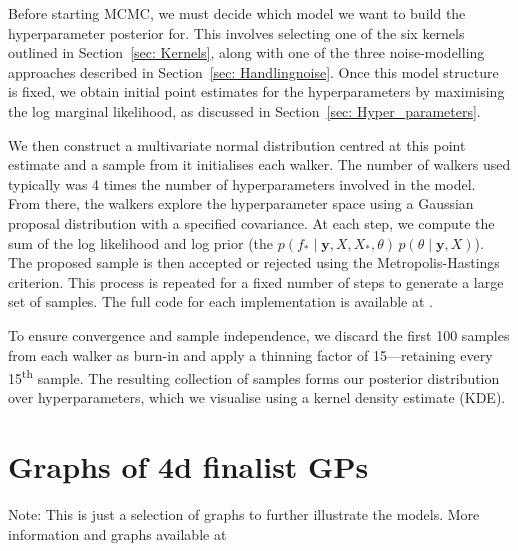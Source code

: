 \documentclass{ucdgradtaughtthesis}
\begin{document}
Before starting MCMC, we must decide which model we want to build the hyperparameter posterior for. This involves selecting one of the six kernels outlined in Section~\ref{sec: Kernels}, along with one of the three noise-modelling approaches described in Section~\ref{sec: Handlingnoise}. Once this model structure is fixed, we obtain initial point estimates for the hyperparameters by maximising the log marginal likelihood, as discussed in Section~\ref{sec: Hyper_parameters}.
%

We then construct a multivariate normal distribution centred at this point estimate and a sample from it initialises each walker. The number of walkers used typically 
was 4 times the number of hyperparameters involved in the model. 
From there, the walkers explore the hyperparameter space using a Gaussian proposal distribution with a specified covariance. At each step, we compute the sum of the log likelihood and log prior (the $p(f_* \mid \mathbf{y}, X, X_*, \theta) \, p(\theta \mid \mathbf{y}, X) $). 
The proposed sample is then accepted or rejected using the Metropolis-Hastings criterion. This process is repeated for a fixed number of steps to generate a large set of samples. The full code for each implementation is available at \cite{githubrepo}.
%

To ensure convergence and sample independence, we discard the first 100 samples from each walker as burn-in and apply a thinning factor of 15—retaining every 15\textsuperscript{th} sample. The resulting collection of samples forms our posterior distribution over hyperparameters, which we visualise using a kernel density estimate (KDE).



\section{Graphs of 4d finalist GPs}
\label{appendix:4d_finalists}
Note: This is just a selection of graphs to further illustrate the models. More information and graphs available at \cite{githubrepo}
\end{document}
